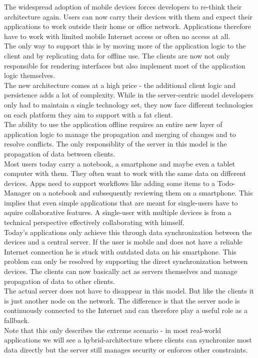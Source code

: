 The widespread adoption of mobile devices forces developers to re-think their architecture again.
Users can now carry their devices with them and expect their applications to work outside their home or office network.
Applications therefore have to work with limited mobile Internet access or often no access at all.\\
The only way to support this is by moving more of the application logic to the client and by replicating data for offline use.
The clients are now not only responsible for rendering interfaces but also implement most of the application logic themselves.\\
The new architecture comes at a high price - the additional client logic and persistence adds a lot of complexity.
While in the server-centric model developers only had to maintain a single technology set, they now face different technologies on each platform they aim to support with a fat client.\\
The ability to use the application offline requires an entire new layer of application logic to manage the propagation and merging of changes and to resolve conflicts.
The only responsiblity of the server in this model is the propagation of data between clients.\\

Most users today carry a notebook, a smartphone and maybe even a tablet computer with them.
They often want to work with the same data on different devices.
Apps need to support workflows like adding some items to a Todo-Manager on a notebook and subsequently reviewing them on a smartphone.
This implies that even simple applications that are meant for single-users have to aquire collaborative features.
A single-user with multiple devices is from a technical perspective effectively collaborating with himself.\\
Today's applications only achieve this through data synchronization between the devices and a central server.
If the user is mobile and does not have a reliable Internet connection he is stuck with outdated data on his smartphone.
This problem can only be resolved by supporting the direct synchronization between devices.
The clients can now basically act as servers themselves and manage propagation of data to other clients.\\
The actual server does not have to disappear in this model.
But like the clients it is just another node on the network.
The difference is that the server node is continuously connected to the Internet and can therefore play a useful role as a fallback.\\
Note that this only describes the extreme scenario - in most real-world applications we will see a hybrid-architecture where clients can synchronize most data directly but the server still manages security or enforces other constraints.\\

